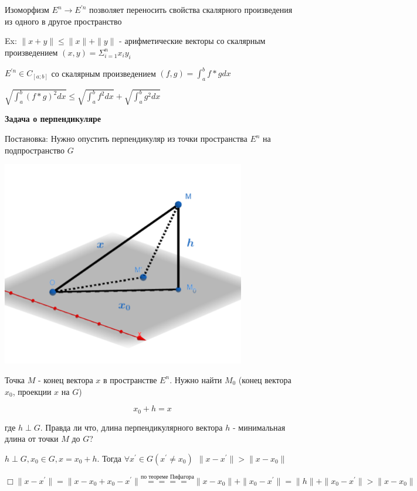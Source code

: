 \documentclass[12pt]{article}
\begin{document}
    \Nota Изоморфизм $\displaystyle E^n \rightarrow E^{\prime n}$ позволяет переносить свойства скалярного произведения
    из одного в другое пространство

    Ex: $\|x + y\| \leq \|x\| + \|y\|$ - арифметические векторы со скалярным произведением $\displaystyle (x, y) = \Sigma^n_{i=1} x_i y_i$

    $\displaystyle E^{\prime n} \in C_{[a;b]}$ со скалярным произведением $\displaystyle (f, g) = \int^b_a f * g dx$

    $\displaystyle \sqrt{\int^b_a (f * g)^2 dx} \leq \sqrt{\int^b_a f^2 dx} + \sqrt{\int^b_a g^2 dx}$

    \textbf{Задача о перпендикуляре}

    Постановка: Нужно опустить перпендикуляр из точки пространства $\displaystyle E^n$ на подпространство $G$

    \includegraphics[height=90mm]{images/specsec_2024_03_01_1}

    Точка $M$ - конец вектора $x$ в пространстве $\displaystyle E^n$.
    Нужно найти $\displaystyle M_0$ (конец вектора $\displaystyle x_0$, проекции $x$ на $G$)

    \[x_0 + h = x\]

    где $h \perp G$. Правда ли что, длина перпендикулярного вектора $h$ - минимальная длина от точки $M$ до $G$?

    \Th $\displaystyle h \perp G, x_0 \in G, x = x_0 + h$. Тогда $\displaystyle \forall x^\prime \in G (x^\prime \neq x_0) \ \ \|x - x^\prime\| > \|x - x_0\|$

    $\displaystyle \Box \|x - x^\prime\| = \|x - x_0 + x_0 - x^\prime\| \stackrel{\text{по теореме Пифагора}}{====} \|x - x_0\| + \|x_0 - x^\prime\| = \|h\| + \|x_0 - x^\prime\| > \|x - x_0\|$
\end{document}
